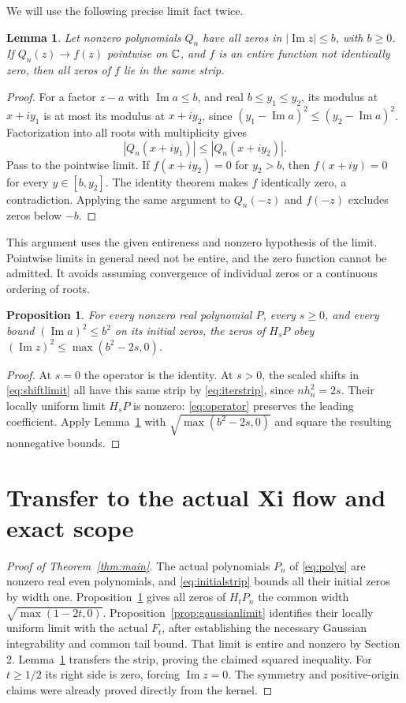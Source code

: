 \documentclass[11pt]{article}
\newtheorem{lemma}[theorem]{Lemma}
\newtheorem{proposition}[theorem]{Proposition}
\begin{document}
We will use the following precise limit fact twice.
\begin{lemma}\label{lem:closure}
Let nonzero polynomials $Q_n$ have all zeros in
$|\operatorname{Im}z|\le b$, with $b\ge0$. If $Q_n(z)\to f(z)$
pointwise on $\mathbb C$, and $f$ is an entire function not identically zero,
then all zeros of $f$ lie in the same strip.
\end{lemma}
\begin{proof}
For a factor $z-a$ with $\operatorname{Im}a\le b$, and real
$b\le y_1\le y_2$, its modulus at $x+iy_1$ is at most its modulus at
$x+iy_2$, since $(y_1-\operatorname{Im}a)^2\le
(y_2-\operatorname{Im}a)^2$. Factorization into all roots with
multiplicity gives
\[
 |Q_n(x+iy_1)|\le|Q_n(x+iy_2)|.
\]
Pass to the pointwise limit. If $f(x+iy_2)=0$ for $y_2>b$, then
$f(x+iy)=0$ for every $y\in[b,y_2]$. The identity theorem makes
$f$ identically zero, a contradiction. Applying the same argument
to $Q_n(-z)$ and $f(-z)$ excludes zeros below $-b$.
\end{proof}
This argument uses the given entireness and nonzero hypothesis of the
limit. Pointwise limits in general need not be entire, and the zero
function cannot be admitted. It avoids assuming convergence of individual
zeros or a continuous ordering of roots.

\begin{proposition}\label{prop:polystrip}
For every nonzero real polynomial $P$, every $s\ge0$, and every bound
$(\operatorname{Im}a)^2\le b^2$ on its initial zeros, the zeros of $H_sP$
obey $(\operatorname{Im}z)^2\le\max(b^2-2s,0)$.
\end{proposition}
\begin{proof}
At $s=0$ the operator is the identity. At $s>0$, the scaled shifts in
\eqref{eq:shiftlimit} all have this same strip by
\eqref{eq:iterstrip}, since $nh_n^2=2s$. Their locally uniform limit
$H_sP$ is nonzero: \eqref{eq:operator} preserves the leading coefficient.
Apply Lemma~\ref{lem:closure} with
$\sqrt{\max(b^2-2s,0)}$ and square the resulting nonnegative bounds.
\end{proof}

\section{Transfer to the actual Xi flow and exact scope}
\begin{proof}[Proof of Theorem~\ref{thm:main}]
The actual polynomials $P_n$ of \eqref{eq:polys} are nonzero real even
polynomials, and \eqref{eq:initialstrip} bounds all their initial zeros
by width one. Proposition~\ref{prop:polystrip} gives all zeros of
$H_tP_n$ the common width $\sqrt{\max(1-2t,0)}$.
Proposition~\ref{prop:gaussianlimit} identifies their locally uniform
limit with the actual $F_t$, after establishing the necessary Gaussian
integrability and common tail bound. That limit is entire and nonzero
by Section 2. Lemma~\ref{lem:closure} transfers the strip, proving the
claimed squared inequality. For $t\ge1/2$ its right side is zero,
forcing $\operatorname{Im}z=0$. The symmetry and positive-origin claims
were already proved directly from the kernel.
\end{proof}
\end{document}
